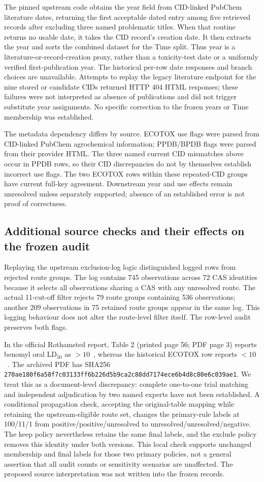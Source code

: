 The pinned upstream code obtains the year field from CID-linked PubChem literature dates, returning the first acceptable dated entry among five retrieved records after excluding three named problematic titles. When that routine returns no usable date, it takes the CID record's creation date. It then extracts the year and sorts the combined dataset for the Time split. Thus year is a literature-or-record-creation proxy, rather than a toxicity-test date or a uniformly verified first-publication year. The historical per-row date responses and branch choices are unavailable. Attempts to replay the legacy literature endpoint for the nine stored or candidate CIDs returned HTTP 404 HTML responses; these failures were not interpreted as absence of publications and did not trigger substitute year assignments. No specific correction to the frozen years or Time membership was established.

The metadata dependency differs by source. ECOTOX use flags were parsed from CID-linked PubChem agrochemical information; PPDB/BPDB flags were parsed from their provider HTML. The three named current CID mismatches above occur in PPDB rows, so their CID discrepancies do not by themselves establish incorrect use flags. The two ECOTOX rows within these repeated-CID groups have current full-key agreement. Downstream year and use effects remain unresolved unless separately supported; absence of an established error is not proof of correctness.

\subsection*{Additional source checks and their effects on the frozen audit}
Replaying the upstream exclusion-log logic distinguished logged rows from rejected route groups. The log contains 745 observations across 72 CAS identities because it selects all observations sharing a CAS with any unresolved route. The actual 11-cut-off filter rejects 79 route groups containing 536 observations; another 209 observations in 75 retained route groups appear in the same log. This logging behaviour does not alter the route-level filter itself. The row-level audit preserves both flags.

In the official Rothamsted report, Table 2 (printed page 56; PDF page 3) reports benomyl oral LD$_{50}$ as $>10$~\ugbee, whereas the historical ECOTOX row reports $<10$~\ugbee. The archived PDF has SHA256 \texttt{270ae180f6a58f7c03133ff6b226d5b9ca2c88dd7174ece6b4d8c80e6c039ae1}. We treat this as a document-level discrepancy: complete one-to-one trial matching and independent adjudication by two named experts have not been established. A conditional propagation check, accepting the original-table mapping while retaining the upstream-eligible route set, changes the primary-rule labels at 100/11/1 from positive/positive/unresolved to unresolved/unresolved/negative. The keep policy nevertheless retains the same final labels, and the exclude policy removes this identity under both versions. This local check supports unchanged membership and final labels for those two primary policies, not a general assertion that all audit counts or sensitivity scenarios are unaffected. The proposed source interpretation was not written into the frozen records.
